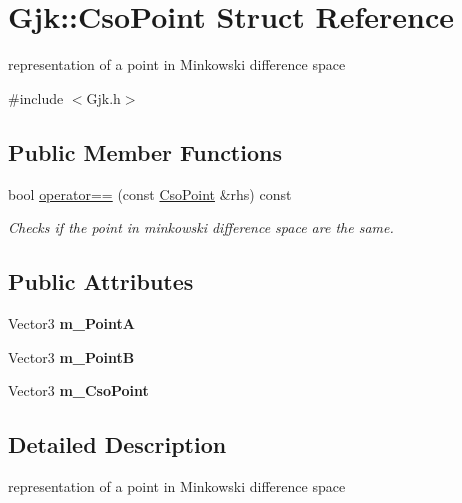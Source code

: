 \hypertarget{structGjk_1_1CsoPoint}{}\section{Gjk\+:\+:Cso\+Point Struct Reference}
\label{structGjk_1_1CsoPoint}


representation of a point in Minkowski difference space  




{\ttfamily \#include $<$Gjk.\+h$>$}

\subsection*{Public Member Functions}
\begin{DoxyCompactItemize}
\item 
bool \hyperlink{structGjk_1_1CsoPoint_ad7e23024e0114e73d6978760a209782c}{operator==} (const \hyperlink{structGjk_1_1CsoPoint}{Cso\+Point} \&rhs) const
\begin{DoxyCompactList}\small\item\em Checks if the point in minkowski difference space are the same. \end{DoxyCompactList}\end{DoxyCompactItemize}
\subsection*{Public Attributes}
\begin{DoxyCompactItemize}
\item 
\mbox{\label{structGjk_1_1CsoPoint_ab6e2f2cde5e989b193061c6ba1362261}} 
Vector3 {\bfseries m\+\_\+\+PointA}
\item 
\mbox{\label{structGjk_1_1CsoPoint_a1fb66d7493641a43ffa4fc2e4efecdc2}} 
Vector3 {\bfseries m\+\_\+\+PointB}
\item 
\mbox{\label{structGjk_1_1CsoPoint_ae9290f076800ece739001b3604018755}} 
Vector3 {\bfseries m\+\_\+\+Cso\+Point}
\end{DoxyCompactItemize}


\subsection{Detailed Description}
representation of a point in Minkowski difference space 

